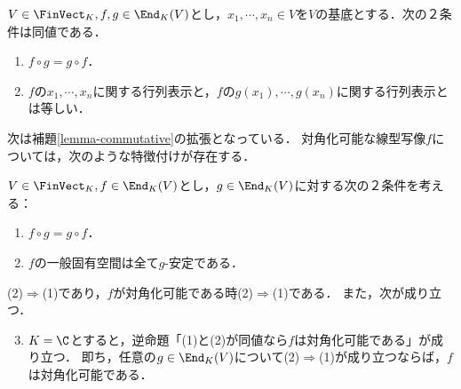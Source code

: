 \documentclass[uplatex, dvipdfmx]{jsreport}
\begin{document}
\begin{proposition}[可換性は共軛類が重なることと同値である]
    $V\in\FinVect_K,f,g\in\End_K(V)$とし，$x_1,\cdots,x_n\in V$を$V$の基底とする．次の２条件は同値である．
    \begin{enumerate}
        \item $f\circ g=g\circ f$．
        \item $f$の$x_1,\cdots,x_n$に関する行列表示と，$f$の$g(x_1),\cdots,g(x_n)$に関する行列表示とは等しい．
    \end{enumerate}
\end{proposition}

次は補題\ref{lemma-commutative}の拡張となっている．
対角化可能な線型写像$f$については，次のような特徴付けが存在する．

\begin{proposition}
    $V\in\FinVect_K,f\in\End_K(V)$とし，$g\in\End_K(V)$に対する次の２条件を考える：
    \begin{enumerate}[(1)]
        \item $f\circ g=g\circ f$．
        \item $f$の一般固有空間は全て$g$-安定である．
    \end{enumerate}
    (2)$\Rightarrow$(1)であり，$f$が対角化可能である時(2)$\Rightarrow$(1)である．
    また，次が成り立つ．
    \begin{enumerate}[(1)]\setcounter{enumi}{2}
        \item $K=\C$とすると，逆命題「(1)と(2)が同値なら$f$は対角化可能である」が成り立つ．
        即ち，任意の$g\in\End_K(V)$について(2)$\Rightarrow$(1)が成り立つならば，$f$は対角化可能である．
    \end{enumerate}
\end{proposition}
\end{document}
